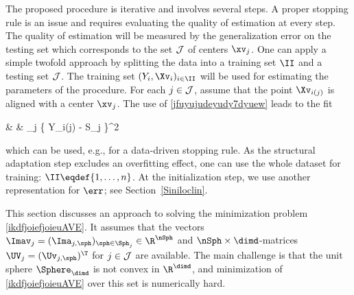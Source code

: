 The proposed procedure is iterative and involves several steps.
A proper stopping rule is an issue and requires evaluating the quality of estimation at every step.
%
The quality of estimation will be measured by the generalization error on the testing set
which corresponds to the set \( \mathcal{J} \) of centers \( \xv_{j} \).
One can apply a simple twofold approach by splitting the data into a training set \( \II \) and a testing set \( \mathcal{J} \).
The training set \( (Y_{i},\Xv_{i})_{i \in \II} \) will be used for estimating the parameters of the procedure.
%
For each \( j \in \mathcal{J} \), assume that the point \( \Xv_{i(j)} \) is aligned  
with a center \( \xv_{j} \).
The use of \eqref{jfuyujudeyudy7dyuew} leads to the fit
\begin{EQA}[rcl]
	\err
	& \eqdef &
	\sum_{j \in \JJJ} \bigl\{ Y_{i(j)} - S_{j} \bigr\}^{2} 
\label{jvfujkiiiut5tyerjfd}
\end{EQA}
which can be used, e.g., for a data-driven stopping rule.
As the structural adaptation step excludes an overfitting effect, one can use the whole dataset for training:
\( \II \eqdef \{ 1,\ldots,n \} \).
At the initialization step, we use another representation for \( \err \); see Section~\ref{Siniloclin}.



\label{SLLaltern}
This section discusses an approach to solving the minimization problem \eqref{ikdfjoiefjoieuAVE}.
It assumes that the vectors
\( \Imav_{j} = (\Ima_{j,\sph})_{\sph \in \Sph_{j}} \in \R^{\nSph} \) and \( \nSph \times \dimd \)-matrices
\( \UV_{j} = (\Uv_{j,\sph})^{\T} \) for \( j \in \mathcal{J} \) are available.
The main challenge is that the unit sphere \( \Sphere_{\dimd} \) is not convex in \( \R^{\dimd} \), 
and minimization of \eqref{ikdfjoiefjoieuAVE} over this set is numerically hard.


